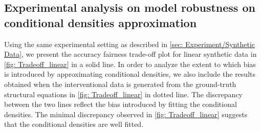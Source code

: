 \documentclass{article} %
\begin{document}



\subsection{Experimental analysis on model robustness on conditional densities approximation} \label{Appendix: Experiment testing fitting performance}

Using the same experimental setting as described in \cref{sec: Experiment/Synthetic Data}, we present the accuracy fairness trade-off plot for linear synthetic data in \cref{fig: Tradeoff_linear} in a solid line. In order to analyze the extent to which bias is introduced by approximating conditional densities, we also include the results obtained when the interventional data is generated from the ground-truth structural equations in \cref{fig: Tradeoff_linear} in dotted line. The discrepancy between the two lines reflect the bias introduced by fitting the conditional densities. The minimal discrepancy observed in \cref{fig: Tradeoff_linear} suggests that the conditional densities are well fitted.
\end{document}
